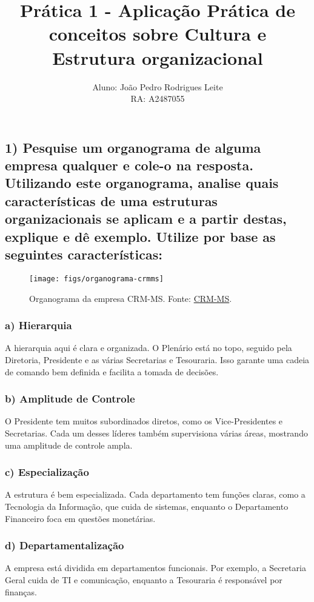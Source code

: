 \documentclass{article}
\title{Prática 1 - Aplicação Prática de conceitos sobre Cultura e Estrutura organizacional}
\author{Aluno: João Pedro Rodrigues Leite \\ RA: A2487055}
\date{}
\begin{document}
	
	\maketitle
	
	\subsection*{1) \textnormal{Pesquise um organograma de alguma empresa qualquer e cole-o na resposta. Utilizando este organograma, analise quais características de uma estruturas organizacionais se aplicam e a partir destas, explique e dê exemplo. Utilize por base as seguintes características:}}
	
	\begin{figure}[H]
		\centering
		\texttt{[image: figs/organograma-crmms]}
	    \caption{Organograma da empresa CRM-MS. Fonte: \href{https://crmms.org.br/institucional-2/organograma}{CRM-MS}.}
		\label{fig:organograma-crmms}
	\end{figure}
		
	\subsubsection*{a) \textnormal{Hierarquia}}
	A hierarquia aqui é clara e organizada. O Plenário está no topo, seguido pela Diretoria, Presidente e as várias Secretarias e Tesouraria. Isso garante uma cadeia de comando bem definida e facilita a tomada de decisões.
	
	\subsubsection*{b) \textnormal{Amplitude de Controle}}
	O Presidente tem muitos subordinados diretos, como os Vice-Presidentes e Secretarias. Cada um desses líderes também supervisiona várias áreas, mostrando uma amplitude de controle ampla.
	
	\subsubsection*{c) \textnormal{Especialização}}
	A estrutura é bem especializada. Cada departamento tem funções claras, como a Tecnologia da Informação, que cuida de sistemas, enquanto o Departamento Financeiro foca em questões monetárias.
	
	\subsubsection*{d) \textnormal{Departamentalização}}
	A empresa está dividida em departamentos funcionais. Por exemplo, a Secretaria Geral cuida de TI e comunicação, enquanto a Tesouraria é responsável por finanças.
	
\end{document}
